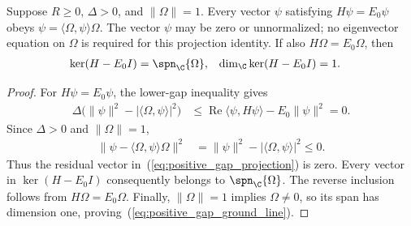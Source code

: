 \begin{theorem}
    \label{thm:positive_gap_uniqueness}
    \leanok
    Suppose $R\ge0$, $\Delta>0$, and $\|\Omega\|=1$.
    Every vector $\psi$ satisfying $H\psi=E_0\psi$ obeys
    $\psi=\langle\Omega,\psi\rangle\Omega$.
    The vector $\psi$ may be zero or unnormalized; no eigenvector equation
    on $\Omega$ is required for this projection identity.
    If also $H\Omega=E_0\Omega$, then
    \begin{align}
        \ker(H-E_0I)&=\spn_{\C}\{\Omega\}, &
        \dim_{\C}\ker(H-E_0I)&=1.
        \label{eq:positive_gap_ground_line}
    \end{align}
\end{theorem}
\begin{proof}\leanok
    For $H\psi=E_0\psi$, the lower-gap inequality gives
    \begin{align}
        \Delta\bigl(\|\psi\|^2-|\langle\Omega,\psi\rangle|^2\bigr)
            &\le \operatorname{Re}\langle\psi,H\psi\rangle
                -E_0\|\psi\|^2=0.
        \label{eq:positive_gap_energy}
    \end{align}
    Since $\Delta>0$ and $\|\Omega\|=1$,
    \begin{align}
        \|\psi-\langle\Omega,\psi\rangle\Omega\|^2
            &=\|\psi\|^2-|\langle\Omega,\psi\rangle|^2\le0.
        \label{eq:positive_gap_projection}
    \end{align}
    Thus the residual vector in~(\ref{eq:positive_gap_projection}) is zero.
    Every vector in $\ker(H-E_0I)$ consequently belongs to
    $\spn_{\C}\{\Omega\}$. The reverse inclusion follows from
    $H\Omega=E_0\Omega$. Finally, $\|\Omega\|=1$ implies $\Omega\ne0$,
    so its span has dimension one, proving~(\ref{eq:positive_gap_ground_line}).
\end{proof}

